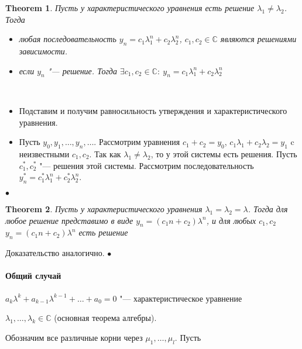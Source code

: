 \documentclass[a4paper]{article}
\theoremstyle{plain}
\newtheorem{theorem}{Theorem}
\theoremstyle{remark}
\theoremstyle{definition}
\renewenvironment{proof}{{\bfseries Proof}}{$\bullet$}
\newcommand{\myC}{\mathbb{C}}
\begin{document}
\begin{theorem}	
	Пусть у характеристического уравнения есть решение $\lambda_1 \neq \lambda_2$. Тогда
	\begin{itemize}
		\item любая последовательность $y_n = c_1 \lambda_1^n + c_2 \lambda_2^n$, $c_1, c_2 \in \myC$ являются решениями зависимости.
		\item если $y_n$ "--- решение. Тогда $\exists c_1,c_2 \in \myC:\ y_n = c_1 \lambda_1^n + c_2 \lambda_2^n$
	\end{itemize}
\end{theorem}

\begin{proof}\\
	\begin{itemize}
		\item Подставим и получим равносильность утверждения и характеристического уравнения. 
		\item Пусть $y_0, y_1, \ldots, y_n,  \ldots$. Рассмотрим уравнения $c_1 + c_2 = y_0$, $c_1\lambda_1 + c_2\lambda_2 = y_1$ c неизвестными $c_1, c_2$. Так как $\lambda_1 \neq \lambda_2$, то у этой системы есть решения. Пусть $c_1^*, c_2^*$ "--- решения этой системы. Рассмотрим последовательность $y_n^* = c_1^* \lambda_1^n + c_2^*\lambda_2^n$.
	\end{itemize}
\end{proof}

\begin{theorem}
	Пусть у характеристического уравнения $\lambda_1 = \lambda_2 = \lambda$. Тогда для любое решение представимо в виде $y_n = (c_1n + c_2) \lambda^n$, и для любых $c_1,c_2$ $y_n = (c_1n + c_2) \lambda^n$ есть решение
\end{theorem}

\begin{proof}
	Доказательство аналогично.
\end{proof}

\paragraph{Общий случай}
$a_k\lambda^k + a_{k-1}\lambda^{k-1} + \ldots + a_0 = 0$ "--- характеристическое уравнение \newline

$\lambda_1, \ldots, \lambda_k \in \myC$ (основная теорема алгебры). 

Обозначим все различные корни через $\mu_1, \ldots, \mu_l$. Пусть 
\end{document}
